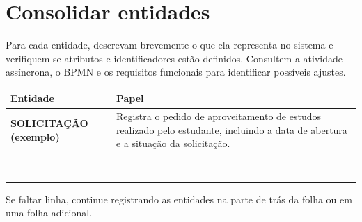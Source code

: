 \section{Consolidar entidades}

Para cada entidade, descrevam brevemente o que ela representa no sistema e verifiquem se
atributos e identificadores estão definidos. Consultem a atividade assíncrona, o BPMN e os
requisitos funcionais para identificar possíveis ajustes.

\begin{table}[!ht]
\centering
\small
\setlength{\tabcolsep}{5pt}
\renewcommand{\arraystretch}{1.8}
\begin{tabularx}{\linewidth}{|>{\raggedright\arraybackslash}p{4.5cm}
                              |>{\raggedright\arraybackslash}X|}
\hline
\textbf{Entidade} & \textbf{Papel} \\
\hline
\textbf{SOLICITAÇÃO (exemplo)} &
Registra o pedido de aproveitamento de estudos realizado pelo estudante, incluindo a data de
abertura e a situação da solicitação. \\
\hline
 & \\ \hline
 & \\ \hline
 & \\ \hline
 & \\ \hline
 & \\ \hline
 & \\ \hline
 & \\ \hline
 & \\ \hline
\end{tabularx}
\end{table}

\begin{warnbox}[Observação]
Se faltar linha, continue registrando as entidades na parte de trás da folha ou em uma folha adicional.
\end{warnbox}
